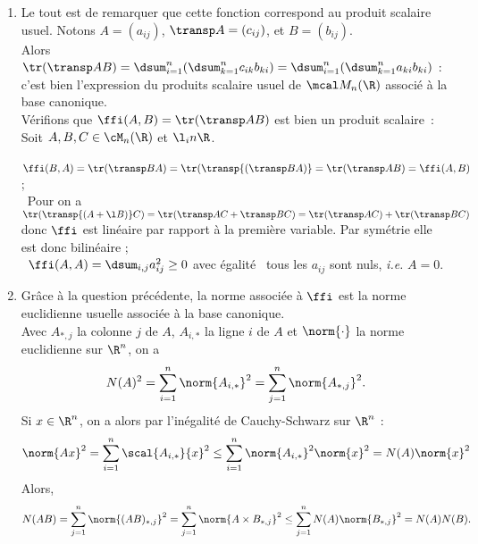 \begin{enumerate}
  \item Le tout est de remarquer que cette fonction correspond au produit scalaire usuel. Notons $A=(a_{ij})$, $\transp A=(c_{ij})$, et $B=(b_{ij})$.\\
  Alors $\tr(\transp AB)=\dsum_{i=1}^n(\dsum_{k=1}^n c_{ik}b_{ki})=\dsum_{i=1}^n(\dsum_{k=1}^n a_{ki}b_{ki})$ : c'est bien l'expression du produits scalaire usuel
  de $\mcal M_n(\R)$ associé à la base canonique.\\
  Vérifions que $\ffi(A,B)=\tr(\transp AB)$ est bien un produit scalaire~:\\
  Soit $A,B,C\in\cM_n(\R)$ et $\l_in\R$.\\
  \bu\ $\ffi(B,A)=\tr(\transp BA)=\tr(\transp{(\transp BA)}=\tr(\transp AB)=\ffi(A,B)$ ;\\
  \bu\ Pour  on a $\tr(\transp{(A+\l B)}C)=\tr(\transp AC + \transp BC)=\tr(\transp AC) + \tr(\transp BC)$ donc $\ffi$ est linéaire par rapport à la première variable. Par
  symétrie elle est donc bilinéaire ;\\
  \bu\ $\ffi(A,A)=\dsum_{i,j} a_{ij}^2\geq 0$ avec égalité \ssi\ tous les $a_{ij}$ sont nuls, \emph{i.e.} $A=0$.
  
  \item Grâce à la question précédente, la norme associée à $\ffi$ est la norme euclidienne usuelle associée à la base canonique.\\
  Avec $A_{\ast,j}$ la colonne $j$ de $A$, $A_{i,\ast}$ la ligne $i$ de $A$ et $\norm{\cdot}$ la norme euclidienne sur $\R^n$, on a
    \begin{equation*}
      N(A)^2 = \sum_{i=1}^n \norm{A_{i,\ast}}^2 = \sum_{j=1}^n \norm{A_{\ast,j}}^2.
    \end{equation*}
    Si $x\in \R^n$, on a alors par l'inégalité de Cauchy-Schwarz sur $\R^n$ :
    \begin{equation*}
      \norm{Ax}^2 = \sum_{i=1}^n \scal{A_{i,\ast}}{x}^2 \leq \sum_{i=1}^n \norm{A_{i,\ast}}^2 \norm{x}^2 = N(A) \norm{x}^2
    \end{equation*}
    Alors,
    \begin{equation*}
      N(AB) = \sum_{j=1}^n \norm{(AB)_{\ast,j}}^2 = \sum_{j=1}^n \norm{A\times B_{\ast,j}}^2 \leq  \sum_{j=1}^n N(A)\norm{B_{\ast,j}}^2 = N(A)N(B).
    \end{equation*}
\end{enumerate}
